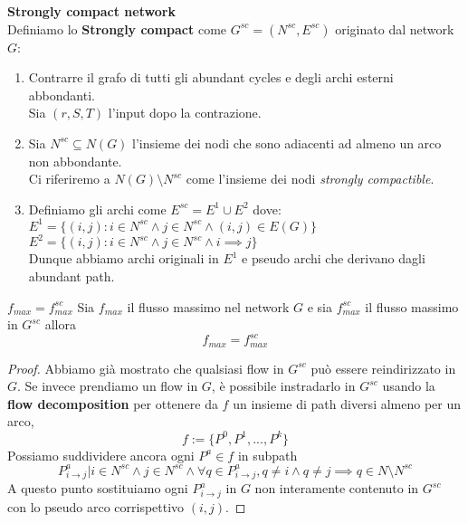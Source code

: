 \textbf{Strongly compact network}\\
    Definiamo lo \textbf{Strongly compact} come $G^{sc} =(N^{sc}, E^{sc})$ originato dal network $G$:
    \begin{enumerate}
        \item Contrarre il grafo di tutti gli abundant cycles e degli archi esterni abbondanti.\\
        Sia $(r,S,T)$ l'input dopo la contrazione.
        \item Sia $N^{sc}\subseteq N(G)$ l'insieme dei nodi che sono adiacenti ad almeno un arco non abbondante.\\
        Ci riferiremo a $N(G)\setminus N^{sc}$ come l'insieme dei nodi \textit{strongly compactible}.
        \item Definiamo gli archi come $E^{sc} = E^1 \cup E^2$ dove:\\
        $E^1 = \{(i,j): i\in N^{sc}\land j\in N^{sc}\land (i,j)\in E(G)\}$\\
        $E^2 = \{(i,j): i\in N^{sc}\land j\in N^{sc}\land i\implies j\}$\\
        Dunque abbiamo archi originali in $E^1$ e pseudo archi che derivano dagli abundant path.
        
    \end{enumerate}
    

   \begin{theorem}[label = fmaxfsc]{$f_{max} = f_{max}^{sc}$}{}
    Sia $f_{max}$ il flusso massimo nel network $G$ e sia $f_{max}^{sc}$ il flusso massimo in $G^{sc}$ allora 
    \[f_{max} = f_{max}^{sc}\]
\end{theorem}
\begin{proof}
    Abbiamo già mostrato che qualsiasi flow in $G^{sc}$ può essere reindirizzato in $G$.
    Se invece prendiamo un flow in $G$, è possibile instradarlo in $G^{sc}$ usando la \textbf{flow decomposition} per ottenere da $f$ un insieme di path diversi almeno per un arco,
    \[f := \{P^0, P^1, ..., P^k\}\]
    Possiamo suddividere ancora ogni $P^a\in f$ in subpath \[P^{a}_{i\rightarrow j}| i\in N^{sc}\land j\in N^{sc}\land \forall q \in P^a_{i\rightarrow j}, q\not = i \land q\not = j \implies q\in N\setminus N^{sc}\] 
    A questo punto sostituiamo ogni $P^{a}_{i\rightarrow j}$ in $G$ non  interamente contenuto in $G^{sc}$ con lo pseudo arco corrispettivo $(i,j)$.
    \QED
\end{proof}



